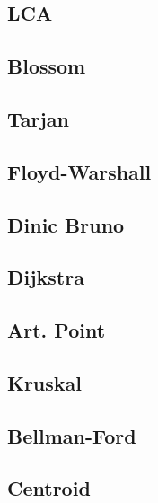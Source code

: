 \documentclass[12pt, a4paper, twoside]{article}
\begin{document}
\subsection{LCA}


\subsection{Blossom}


\subsection{Tarjan}


\subsection{Floyd-Warshall}


\subsection{Dinic Bruno}


\subsection{Dijkstra}


\subsection{Art. Point}


\subsection{Kruskal}


\subsection{Bellman-Ford}


\subsection{Centroid}

\end{document}
